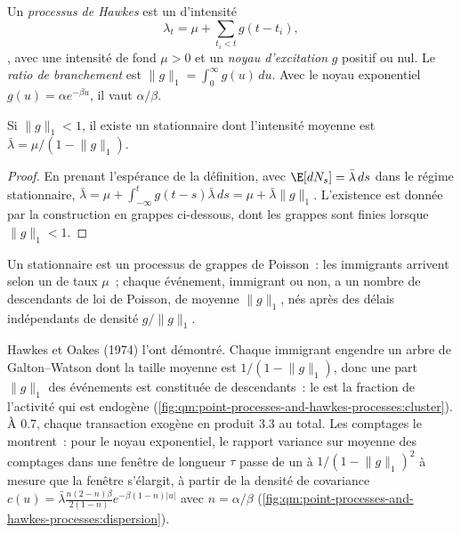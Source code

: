 \begin{definition}\label{def:qm:point-processes-and-hawkes-processes:hawkes}
Un \emph{processus de Hawkes} est un  d'intensité
\[
\lambda_t = \mu + \sum_{t_i < t}g(t - t_i),
\],
avec une intensité de fond $\mu > 0$ et un \emph{noyau d'excitation} $g$ positif ou nul. Le
\emph{ratio de branchement} est $\lVert g\rVert_1 = \int_0^\infty g(u)\,du$. Avec le noyau
exponentiel $g(u) = \alpha e^{-\beta u}$, il vaut $\alpha/\beta$.
\end{definition}

\begin{proposition}\label{prop:qm:point-processes-and-hawkes-processes:mean}
Si $\lVert g\rVert_1 < 1$, il existe un  stationnaire dont l'intensité moyenne est $\bar\lambda =
\mu/(1 - \lVert g\rVert_1)$.
\end{proposition}

\begin{proof}
En prenant l'espérance de la définition, avec $\E[dN_s] = \bar\lambda\,ds$ dans le régime stationnaire,
$\bar\lambda = \mu + \int_{-\infty}^t g(t - s)\bar\lambda\,ds = \mu + \bar\lambda\lVert g\rVert_1$. L'existence est donnée par la
construction en grappes ci-dessous, dont les grappes sont finies lorsque $\lVert g\rVert_1 < 1$.
\end{proof}

\begin{theorem}\label{thm:qm:point-processes-and-hawkes-processes:cluster}
Un  stationnaire est un processus de grappes de Poisson~: les immigrants arrivent selon un  de taux
$\mu$~; chaque événement, immigrant ou non, a un nombre de descendants de loi de Poisson, de moyenne $\lVert g\rVert_1$, nés
après des délais indépendants de densité $g/\lVert g\rVert_1$.
\end{theorem}

\admitted

Hawkes et Oakes (1974) l'ont démontré. Chaque immigrant engendre un arbre de Galton--Watson dont la taille moyenne est
$1/(1 - \lVert g\rVert_1)$, donc une part $\lVert g\rVert_1$ des événements est constituée de descendants~: le  est la
fraction de l'activité qui est endogène (\cref{fig:qm:point-processes-and-hawkes-processes:cluster}). À
0.7, chaque transaction exogène en produit 3.3 au total. Les comptages le montrent~: pour le noyau exponentiel, le
rapport variance sur moyenne des comptages dans une fenêtre de longueur $\tau$ passe de un à $1/(1 - \lVert g\rVert_1)^2$ à mesure que la
fenêtre s'élargit, à partir de la densité de covariance $c(u) = \bar\lambda\frac{n(2-n)\beta}{2(1-n)}e^{-\beta(1-n)|u|}$ avec $n =
\alpha/\beta$ (\cref{fig:qm:point-processes-and-hawkes-processes:dispersion}).

